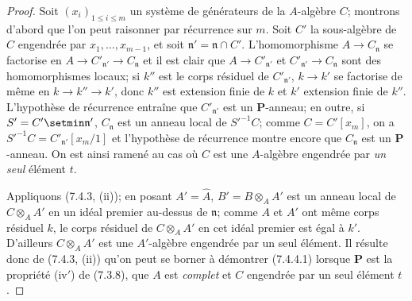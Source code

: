 \begin{proof}
Soit $(x_i)_{1\leqslant i\leqslant m}$ un système de générateurs de la
$A$-algèbre $C$; montrons d'abord que l'on peut raisonner par récurrence sur
$m$. Soit $C'$ la sous-algèbre de $C$ engendrée par
$x_1,\ldots,x_{m-1}$, et soit $\mathfrak n'=\mathfrak n\cap C'$.
L'homomorphisme $A\to C_{\mathfrak n}$ se factorise en
$A\to C'_{\mathfrak n'}\to C_{\mathfrak n}$ et il est clair que
$A\to C'_{\mathfrak n'}$ et $C'_{\mathfrak n'}\to C_{\mathfrak n}$ sont
des homomorphismes locaux; si $k''$ est le corps résiduel de
$C'_{\mathfrak n'}$, $k\to k'$ se factorise de même en
$k\to k''\to k'$, donc $k''$ est extension finie de $k$ et $k'$ extension
finie de $k''$. L'hypothèse de récurrence entraîne que
$C'_{\mathfrak n'}$ est un $\boldsymbol P$-anneau; en outre, si
$S'=C'\setmin\mathfrak n'$, $C_{\mathfrak n}$ est un anneau local de
$S'^{-1}C$; comme $C=C'[x_m]$, on a
$S'^{-1}C=C'_{\mathfrak n'}[x_m/1]$ et l'hypothèse de récurrence montre
encore que $C_{\mathfrak n}$ est un $\boldsymbol P$-anneau. On est ainsi
ramené au cas où $C$ est une $A$-algèbre engendrée par \emph{un seul}
élément $t$.

Appliquons (7.4.3, (ii)); en posant $A'=\widehat A$,
$B'=B\otimes_A A'$ est un anneau local de $C\otimes_A A'$ en un idéal
premier au-dessus de $\mathfrak n$; comme $A$ et $A'$ ont même corps
résiduel $k$, le corps résiduel de $C\otimes_A A'$ en cet idéal premier est
égal à $k'$. D'ailleurs $C\otimes_A A'$ est une $A'$-algèbre engendrée par
un seul élément. Il résulte donc de (7.4.3, (ii)) qu'on peut se borner à
démontrer (7.4.4.1) lorsque $\boldsymbol P$ est la propriété (iv$'$) de
(7.3.8), que $A$ est \emph{complet} et $C$ engendrée par un seul élément
$t$.


\end{proof}
